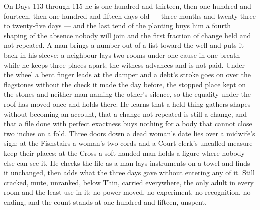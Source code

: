\documentclass{design/chronicle}
\begin{document}
{On Days 113 through 115 he is one hundred and thirteen, then one hundred and fourteen, then one hundred and fifteen days old — three months and twenty-three to twenty-five days — and the last tend of the planting buys him a fourth shaping of the absence nobody will join and the first fraction of change held and not repeated. A man brings a number out of a fist toward the well and puts it back in his sleeve; a neighbour lays two rooms under one cause in one breath while he keeps three places apart; the witness advances and is not paid. Under the wheel a bent finger leads at the damper and a debt’s stroke goes on over the flagstones without the check it made the day before, the stopped place kept on the stones and neither man naming the other’s silence, so the equality under the roof has moved once and holds there. He learns that a held thing gathers shapes without becoming an account, that a change not repeated is still a change, and that a file done with perfect exactness buys nothing for a body that cannot close two inches on a fold. Three doors down a dead woman’s date lies over a midwife’s sign; at the Fishstairs a woman’s two cords and a Court clerk’s uncalled measure keep their places; at the Cross a soft-handed man holds a figure where nobody else can see it. He checks the file as a man lays instruments on a towel and finds it unchanged, then adds what the three days gave without entering any of it. Still cracked, mute, unranked, below Thin, carried everywhere, the only adult in every room and the least use in it; no power moved, no experiment, no recognition, no ending, and the count stands at one hundred and fifteen, unspent.

}
\end{document}
